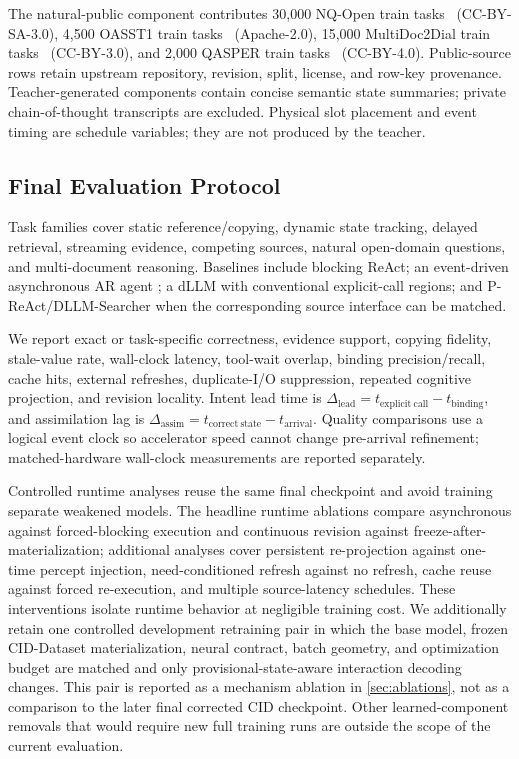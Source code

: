 The natural-public component contributes 30,000 NQ-Open train tasks~\citep{kwiatkowski2019natural,lee2019latent} (CC-BY-SA-3.0), 4,500 OASST1 train
tasks~\citep{kopf2023openassistant} (Apache-2.0), 15,000 MultiDoc2Dial train tasks~\citep{feng2021multidoc2dial} (CC-BY-3.0), and 2,000 QASPER train tasks~\citep{dasigi2021qasper}
(CC-BY-4.0). Public-source rows retain upstream repository, revision, split, license, and row-key
provenance. Teacher-generated components contain concise semantic state summaries; private
chain-of-thought transcripts are excluded. Physical slot placement and event timing are schedule variables; they are not produced by the teacher.

\subsection{Final Evaluation Protocol}

Task families cover static reference/copying, dynamic state tracking, delayed retrieval, streaming
evidence, competing sources, natural open-domain questions, and multi-document reasoning. Baselines
include blocking ReAct; an event-driven asynchronous AR agent \citep{ginart2024asynchronous,hooper2026realtime};
a dLLM with conventional explicit-call regions; and P-ReAct/DLLM-Searcher \citep{zhao2026dllmsearcher}
when the corresponding source interface can be matched.

We report exact or task-specific correctness, evidence support, copying fidelity, stale-value rate,
wall-clock latency, tool-wait overlap, binding precision/recall, cache hits, external refreshes,
duplicate-I/O suppression, repeated cognitive projection, and revision locality. Intent lead time is
$\Delta_{\mathrm{lead}}=t_{\mathrm{explicit\ call}}-t_{\mathrm{binding}}$, and assimilation lag is
$\Delta_{\mathrm{assim}}=t_{\mathrm{correct\ state}}-t_{\mathrm{arrival}}$. Quality comparisons use
a logical event clock so accelerator speed cannot change pre-arrival refinement; matched-hardware
wall-clock measurements are reported separately.

Controlled runtime analyses reuse the same final checkpoint and avoid training separate weakened
models. The headline runtime ablations compare asynchronous against forced-blocking execution and
continuous revision against freeze-after-materialization; additional analyses cover persistent
re-projection against one-time percept injection, need-conditioned refresh against no refresh, cache
reuse against forced re-execution, and multiple source-latency schedules. These interventions isolate
runtime behavior at negligible training cost. We additionally retain one controlled development
retraining pair in which the base model, frozen CID-Dataset materialization, neural contract, batch
geometry, and optimization budget are matched and only provisional-state-aware interaction decoding
changes. This pair is reported as a mechanism ablation in \cref{sec:ablations}, not as a comparison to
the later final corrected CID checkpoint. Other learned-component removals that would require new full
training runs are outside the scope of the current evaluation.

